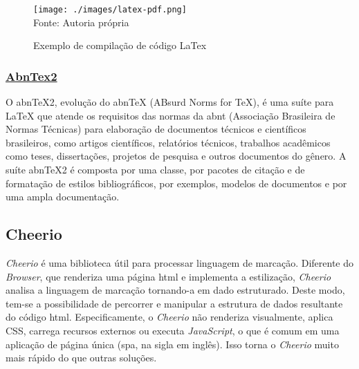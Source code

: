 \begin{figure}[H]
    \centering
    \caption{Exemplo de compilação de código LaTex}
    \texttt{[image: ./images/latex-pdf.png]}
    \label{fig:latex-pdf} \\
    \textnormal{\fontsize{10pt}{12pt}Fonte: Autoria própria}
\end{figure}

\subsubsection{\underline{AbnTex2}}

\vspace{15mm}
    \noindent
    \begin{minipage}{\textwidth}
        \noindent
        \begin{minipage}{4cm}
        \end{minipage}%
        \hfill
        \begin{minipage}{\dimexpr\textwidth-4cm}
            \hspace*{\parindent}
            \fontsize{10pt}{12pt}\selectfont %
            O abnTeX2, evolução do abnTeX (ABsurd Norms for TeX), é uma suíte para LaTeX que atende os requisitos das normas da
\acrshort{abnt}
(Associação Brasileira de Normas Técnicas) para elaboração de documentos técnicos e científicos brasileiros, como artigos científicos, relatórios técnicos, trabalhos acadêmicos como teses, dissertações, projetos de pesquisa e outros documentos do gênero.
 A suíte abnTeX2 é composta por uma classe, por pacotes de citação e de formatação de estilos bibliográficos, por exemplos, modelos de documentos e por uma ampla documentação.
 \cite{abntex2}
        \end{minipage}
    \end{minipage}
    \vspace{15mm}

\subsection{Cheerio}

\textit{Cheerio} é uma biblioteca útil para processar linguagem de marcação.
Diferente do \textit{Browser}, que renderiza uma página
\acrshort{html}
e implementa a estilização, \textit{Cheerio} analisa a linguagem de marcação
tornando-a em dado estruturado. Deste modo, tem-se a possibilidade
de percorrer e manipular a estrutura de dados resultante do
código
\acrshort{html}.
Especificamente, o \textit{Cheerio} não renderiza visualmente, aplica CSS,
carrega recursos externos ou executa \textit{JavaScript}, o que é comum
em uma aplicação de página única
(\acrshort{spa},
na sigla em inglês).
Isso torna o \textit{Cheerio} muito mais rápido do que outras soluções.

